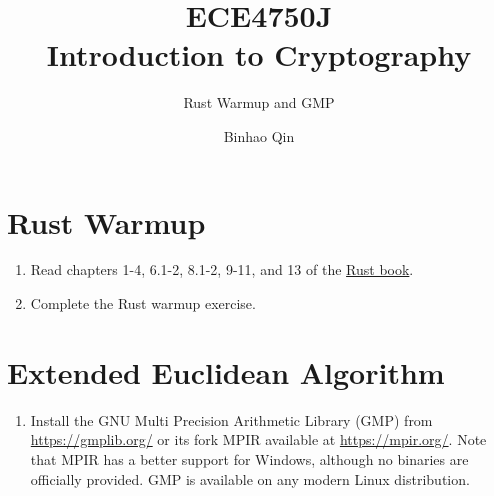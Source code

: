 \documentclass[11pt,a4paper]{article}
\title{ECE4750J\\ Introduction to Cryptography}
\subtitle{Rust Warmup and GMP}
\author{Binhao Qin}
\begin{document}
\maketitle
\section{Rust Warmup}
\begin{enumerate}
	\item Read chapters 1-4, 6.1-2, 8.1-2, 9-11, and 13 of the \href{https://doc.rust-lang.org/book/}{Rust book}.
	\item Complete the Rust warmup exercise.
\end{enumerate}
\section{Extended Euclidean Algorithm}
\begin{enumerate}
	\item Install the GNU Multi Precision Arithmetic Library (GMP) from \href{https://gmplib.org/}{https://gmplib.org/} or its fork MPIR available at \href{https://mpir.org/}{https://mpir.org/}. Note that MPIR has a better support for Windows, although no binaries are officially provided. GMP is available on any modern Linux distribution.
\end{enumerate}
\end{document}
